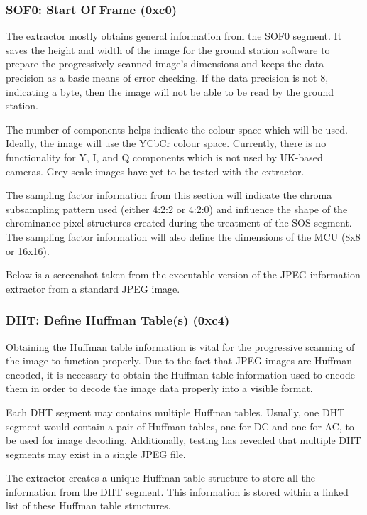 \subsubsection{SOF0: Start Of Frame (0xc0)}

The extractor mostly obtains general information from the SOF0 segment. 
It saves the height and width of the image for the ground station
software to prepare the progressively scanned image's dimensions
and keeps the data precision as a basic means of error checking. 
If the data precision is not 8, indicating a byte, then the image will not
be able to be read by the ground station.

The number of components helps indicate the colour space which will
be used. Ideally, the image will use the YCbCr colour space. Currently,
there is no functionality for Y, I, and Q components  which is not
used by UK-based cameras. Grey-scale images have yet to be
tested with the extractor.

The sampling factor information from this section will indicate
the chroma subsampling pattern used (either 4:2:2 or 4:2:0)
and influence the shape of the chrominance pixel structures
created during the treatment of the SOS segment. The 
sampling factor information will also define the dimensions of the
MCU (8x8 or 16x16).

Below is a screenshot taken from the executable version of
the JPEG information extractor from a standard JPEG image.


\subsubsection{DHT: Define Huffman Table(s) (0xc4)}

Obtaining the Huffman table information is vital for the
progressive scanning of the image to function properly.
Due to the fact that JPEG images are Huffman-encoded,
it is necessary to obtain the Huffman table information
used to encode them in order to decode the image
data properly into a visible format.

Each DHT segment may contains multiple Huffman tables.
Usually, one DHT segment would contain a pair of Huffman 
tables, one for DC and one for AC, to be used for image
decoding. Additionally, testing has revealed that 
multiple DHT segments may exist in a single JPEG file.

The extractor creates a unique Huffman table structure to
store all the information from the DHT segment. This information
is stored within a linked list of these Huffman table structures.

